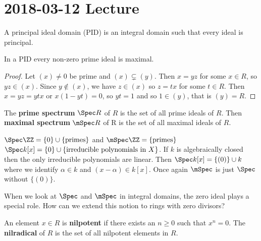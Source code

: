\section{2018-03-12 Lecture}

\begin{defn}
	A principal ideal domain (PID) is an integral domain such that every ideal is principal.
\end{defn}

\begin{prop}[0.9]
	In a PID every non-zero prime ideal is maximal.
\end{prop}

\begin{proof}
	Let $(x) \neq 0$ be prime and $(x) \subsetneq (y)$.
	Then $x=yz$ for some $x \in R$, so $yz \in (x)$.
	Since $y \notin (x)$, we have $z \in (x)$ so $z=tx$ for some $t \in R$.
	Then $x=yz=ytx$ or $x(1-yt)=0$, so $yt=1$ and so $1 \in (y)$, that is $(y)=R$.
\end{proof}

\begin{defn}[0.10]
	The \textbf{prime spectrum} $\Spec R$ of $R$ is the set of all prime ideals of $R$.
	Then \textbf{maximal spectrum} $\mSpec R$ of R is the set of all maximal ideals of $R$.
\end{defn}

\begin{exam}
	\begin{enum}
		\io $\Spec \ZZ = \{0\} \cup \{\text{primes}\}$ and $\mSpec \ZZ = \{\text{primes}\}$
		\io $\Spec k[x] = \{0\} \cup \{\text{irreducible polynomials in }X\}$.
		\io If $k$ is algebraically closed then the only irreducible polynomials are linear.
		Then $\Spec k[x] = \{(0)\} \cup k$ where we identify $\alpha \in k$ and $(x-\alpha) \in k[x]$.
		Once again $\mSpec$ is just $\Spec$ without $\{(0)\}$.
	\end{enum}
\end{exam}

When we look at $\Spec$ and $\mSpec$ in integral domains, the zero ideal plays a special role.
How can we extend this notion to rings with zero divisors?

\begin{defn}[0.11]
	\begin{enum}
		\io An element $x \in R$ is \textbf{nilpotent} if there exists an $n \geq 0$ such that $x^n=0$.
		\io The \textbf{nilradical} of $R$ is the set of all nilpotent elements in $R$.
	\end{enum}
\end{defn}

